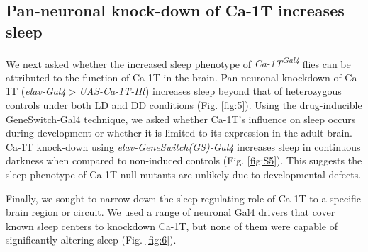 \subsection*{Pan-neuronal knock-down of Ca-\alpha1T increases sleep}

We next asked whether the increased sleep phenotype of \emph{Ca-\alpha1T\textsuperscript{Gal4}} flies can be attributed to the function of Ca-\alpha1T in the brain.
Pan-neuronal knockdown of Ca-\alpha1T (\emph{elav-Gal4$>$UAS-Ca-\alpha1T-IR}) increases sleep beyond that of heterozygous controls under both LD and DD conditions (Fig. \ref{fig:5}).
Using the drug-inducible GeneSwitch-Gal4 technique\cite{Osterwalder:2001cl}, we asked whether Ca-\alpha1T's influence on sleep occurs during development or whether it is limited to its expression in the adult brain.
Ca-\alpha1T knock-down using \emph{elav-GeneSwitch(GS)-Gal4} increases sleep in continuous darkness when compared to non-induced controls (Fig. \ref{fig:S5}).
This suggests the sleep phenotype of Ca-\alpha1T-null mutants are unlikely due to developmental defects.

Finally, we sought to narrow down the sleep-regulating role of Ca-\alpha1T to a specific brain region or circuit.
We used a range of neuronal Gal4 drivers that cover known sleep centers to knockdown Ca-\alpha1T, but none of them were capable of significantly altering sleep (Fig. \ref{fig:6}).
